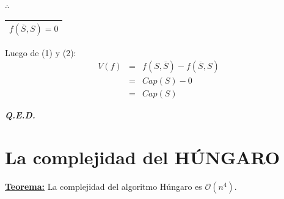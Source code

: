 \documentclass[12pt,a4paper]{report}
\newcommand{\QED}{\hfill \textit{\textbf{Q.E.D.}}}
\begin{document}
\begin{enumerate}[(1)]
							\begin{center}
								\par $\therefore$ \begin{tabular}{|c|} \hline $ f(\overline{S}, S) = 0 $ \\\hline \end{tabular}
							\end{center}

					\end{enumerate}

					\par Luego de (1) y (2):
					\begin{eqnarray}
						\nonumber V(f) &=& f(S, \overline{S}) - f(\overline{S}, S)\\
						\nonumber &=& Cap(S) - 0 \\
						\nonumber &=& Cap(S)
					\end{eqnarray}

		\QED

	\section{La complejidad del HÚNGARO}
		\textbf{\underline{Teorema:}} La complejidad del algoritmo Húngaro es $\mathcal{O}(n^{4})$.
\end{document}
